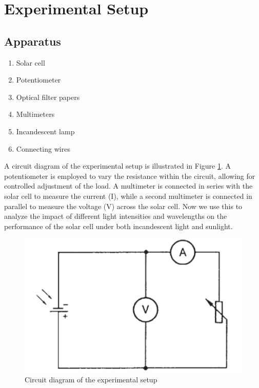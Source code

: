 \section{Experimental Setup}

\subsection*{Apparatus}

\begin{enumerate}
    \item Solar cell
    \item Potentiometer
    \item Optical filter papers
    \item Multimeters
    \item Incandescent lamp 
    \item Connecting wires\\
\end{enumerate}

A circuit diagram of the experimental setup is illustrated in Figure \ref{circuit}. A potentiometer is employed to vary the resistance within
the circuit, allowing for controlled adjustment of the load.
A multimeter is connected in series with the solar cell
to measure the current (I), while a second multimeter is
connected in parallel to measure the voltage (V) across
the solar cell. Now we use this to analyze the
impact of different light intensities and wavelengths on the performance of the solar cell under both incandescent light and sunlight.

\begin{figure}[H]
    \centering
    \includegraphics[width=0.7\columnwidth]{images/circuit.png}
    \caption{Circuit diagram of the experimental setup}
    \label{circuit}
\end{figure}